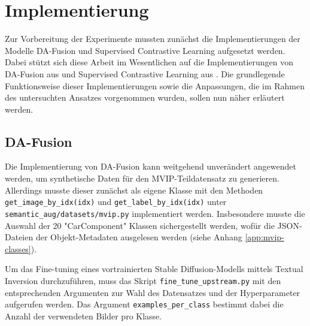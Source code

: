 \section{Implementierung} \label{sec:implementation}


Zur Vorbereitung der Experimente mussten zunächst die Implementierungen der Modelle DA-Fusion und Supervised Contrastive Learning aufgesetzt werden. Dabei stützt sich diese Arbeit im Wesentlichen auf die Implementierungen von DA-Fusion aus \parencite{Trabucco2024dafusiongithub} und Supervised Contrastive Learning aus \parencite{Tian2023supcongithub}. Die grundlegende Funktionsweise dieser Implementierungen sowie die Anpassungen, die im Rahmen des untersuchten Ansatzes vorgenommen wurden, sollen nun näher erläutert werden.

\subsection{DA-Fusion} \label{subsec:da-fusion-implementation}

Die Implementierung von DA-Fusion kann weitgehend unverändert angewendet werden, um synthetische Daten für den MVIP-Teildatensatz zu generieren. Allerdings musste dieser zunächst als eigene Klasse mit den Methoden \lstinline{get_image_by_idx(idx)} und \lstinline{get_label_by_idx(idx)} unter \lstinline{semantic_aug/datasets/mvip.py} implementiert werden. Insbesondere musste die Auswahl der 20 "CarComponent" Klassen sichergestellt werden, wofür die JSON-Dateien der Objekt-Metadaten ausgelesen werden (siehe Anhang \ref{app:mvip-classes}). %

Um das Fine-tuning eines vortrainierten Stable Diffusion-Modells mittels Textual Inversion durchzuführen, muss das Skript \lstinline{fine_tune_upstream.py} mit den entsprechenden Argumenten zur Wahl des Datensatzes und der Hyperparameter aufgerufen werden. Das Argument \lstinline{examples_per_class} bestimmt dabei die Anzahl der verwendeten Bilder pro Klasse.

